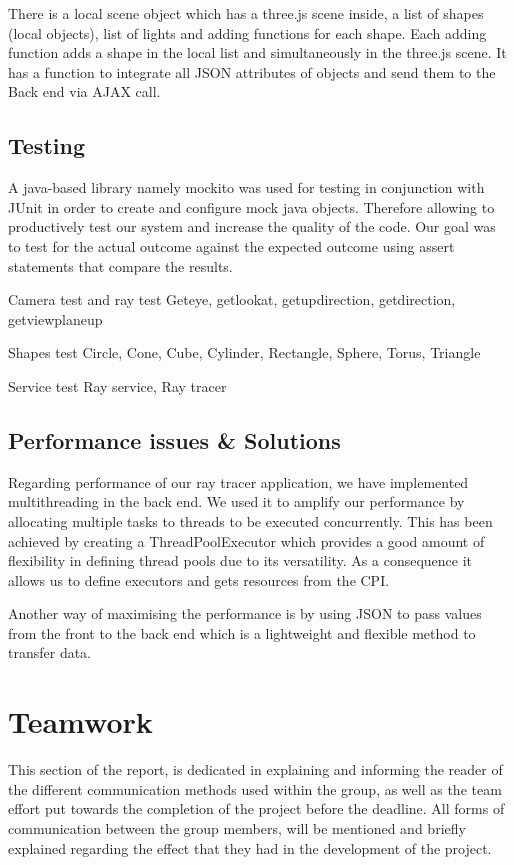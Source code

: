 \documentclass[11pt,a4paper]{article}
\begin{document}
There is a local scene object which has a three.js scene inside, a list of shapes (local objects), list of lights and adding functions for each shape. Each adding function adds a shape in the local list and simultaneously in the three.js scene. It has a function to integrate all JSON attributes of objects and send them to the Back end via AJAX call.


\subsection{Testing}
A java-based library namely mockito was used for testing in conjunction with JUnit in order to create and configure mock java objects. Therefore allowing to productively test our system and increase the quality of the code. Our goal was to test for the actual outcome against the expected outcome using assert statements that compare the results.

Camera test and ray test 
Geteye, getlookat, getupdirection, getdirection, getviewplaneup

Shapes test 
Circle, Cone, Cube, Cylinder, Rectangle, Sphere, Torus, Triangle

Service test
Ray service, Ray tracer

\subsection{Performance issues & Solutions}
Regarding performance of our ray tracer application, we have implemented multithreading in the back end. We used it to amplify our performance by allocating multiple tasks to threads to be executed concurrently. This has been achieved by creating a ThreadPoolExecutor which provides a good amount of flexibility in defining thread pools due to its versatility. As a consequence it allows us to define executors and gets resources from the CPI.

Another way of maximising the performance is by using JSON to pass values from the front to the back end which is a lightweight and flexible method to transfer data. 


\section{Teamwork}
This section of the report, is dedicated in explaining and informing the reader of the different communication methods used within the group, as well as the team effort put towards the completion of the project before the deadline. All forms of communication between the group members, will be mentioned and briefly explained regarding the effect that they had in the development of the project. 
\end{document}
